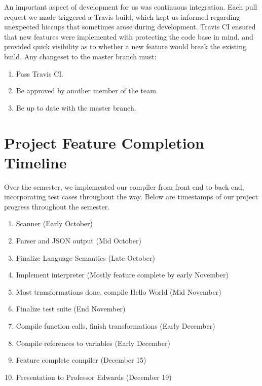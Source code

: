   \medskip \noindent
  An important aspect of development for us was continuous integration. Each pull request we made triggered a Travis build, which kept us informed regarding unexpected hiccups that sometimes arose during development. Travis CI ensured that new features were implemented with protecting the code base in mind, and provided quick visibility as to whether a new feature would break the existing build. Any changeset to the master branch must:

  \begin{enumerate}
    \item Pass Travis CI.
    \item Be approved by another member of the team.
    \item Be up to date with the master branch.
  \end{enumerate}

\section{Project Feature Completion Timeline}
Over the semester, we implemented our compiler from front end to back end, incorporating test cases throughout the way. Below are timestamps of our project progress throughout the semester.

  \begin{enumerate}
    \item Scanner (Early October)
    \item Parser and JSON output (Mid October)
    \item Finalize Language Semantics (Late October)
    \item Implement interpreter (Mostly feature complete by early November)
    \item Most transformations done, compile Hello World (Mid November)
    \item Finalize test suite (End November)
    \item Compile function calls, finish transformations (Early December)
    \item Compile references to variables (Early December)
    \item Feature complete compiler (December 15)
    \item Presentation to Professor Edwards (December 19)
  \end{enumerate}


